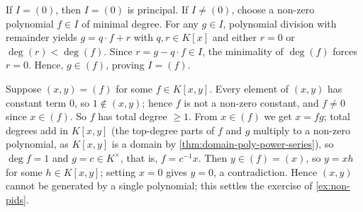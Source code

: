 \begin{content}

\begin{steps}
If $I = (0)$, then $I = (0)$ is principal. If $I \neq (0)$, choose a non-zero polynomial $f \in I$ of minimal degree. For any $g \in I$, polynomial division with remainder yields $g = q \cdot f + r$ with $q, r \in K[x]$ and either $r = 0$ or $\deg(r) < \deg(f)$. Since $r = g - q \cdot f \in I$, the minimality of $\deg(f)$ forces $r = 0$. Hence, $g \in (f)$, proving $I = (f)$.
\end{steps}



\begin{steps}
Suppose $(x, y) = (f)$ for some $f \in K[x, y]$. Every element of $(x, y)$ has constant term $0$, so $1 \notin (x, y)$; hence $f$ is not a non-zero constant, and $f \neq 0$ since $x \in (f)$. So $f$ has total degree $\ge 1$. From $x \in (f)$ we get $x = f g$; total degrees add in $K[x, y]$ (the top-degree parts of $f$ and $g$ multiply to a non-zero polynomial, as $K[x, y]$ is a domain by \cref{thm:domain-poly-power-series}), so $\deg f = 1$ and $g = c \in K^\times$, that is, $f = c^{-1} x$. Then $y \in (f) = (x)$, so $y = x h$ for some $h \in K[x, y]$; setting $x = 0$ gives $y = 0$, a contradiction. Hence $(x, y)$ cannot be generated by a single polynomial; this settles the exercise of \cref{ex:non-pids}.
\end{steps}
\end{content}


